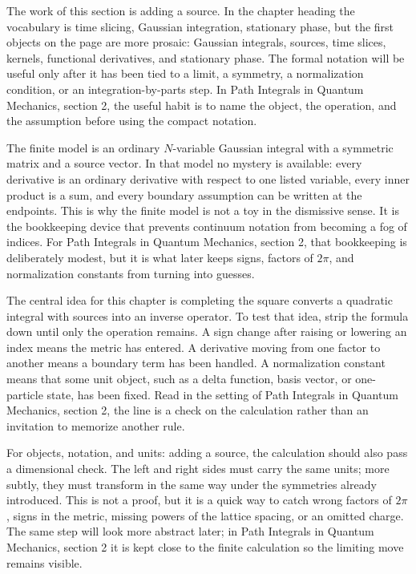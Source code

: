The work of this section is adding a source.  In the chapter heading the vocabulary is time slicing, Gaussian integration, stationary phase, but the first objects on the page are more prosaic: Gaussian integrals, sources, time slices, kernels, functional derivatives, and stationary phase.  The formal notation will be useful only after it has been tied to a limit, a symmetry, a normalization condition, or an integration-by-parts step.  In Path Integrals in Quantum Mechanics, section 2, the useful habit is to name the object, the operation, and the assumption before using the compact notation.

The finite model is an ordinary \(N\)-variable Gaussian integral with a symmetric matrix and a source vector.  In that model no mystery is available: every derivative is an ordinary derivative with respect to one listed variable, every inner product is a sum, and every boundary assumption can be written at the endpoints.  This is why the finite model is not a toy in the dismissive sense.  It is the bookkeeping device that prevents continuum notation from becoming a fog of indices.  For Path Integrals in Quantum Mechanics, section 2, that bookkeeping is deliberately modest, but it is what later keeps signs, factors of \(2\pi\), and normalization constants from turning into guesses.

The central idea for this chapter is completing the square converts a quadratic integral with sources into an inverse operator.  To test that idea, strip the formula down until only the operation remains.  A sign change after raising or lowering an index means the metric has entered.  A derivative moving from one factor to another means a boundary term has been handled.  A normalization constant means that some unit object, such as a delta function, basis vector, or one-particle state, has been fixed.  Read in the setting of Path Integrals in Quantum Mechanics, section 2, the line is a check on the calculation rather than an invitation to memorize another rule.

For objects, notation, and units: adding a source, the calculation should also pass a dimensional check.  The left and right sides must carry the same units; more subtly, they must transform in the same way under the symmetries already introduced.  This is not a proof, but it is a quick way to catch wrong factors of \(2\pi\), signs in the metric, missing powers of the lattice spacing, or an omitted charge.  The same step will look more abstract later; in Path Integrals in Quantum Mechanics, section 2 it is kept close to the finite calculation so the limiting move remains visible.

